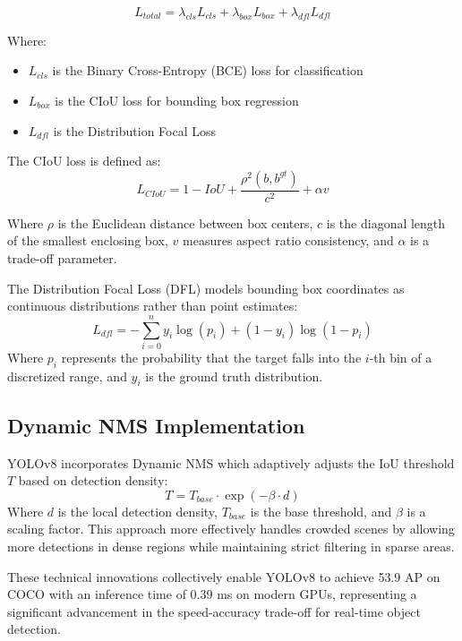 \documentclass[11pt]{article}
\begin{document}
\begin{equation}
L_{total} = \lambda_{cls}L_{cls} + \lambda_{box}L_{box} + \lambda_{dfl}L_{dfl}
\end{equation}

Where:
\begin{itemize}
\item $L_{cls}$ is the Binary Cross-Entropy (BCE) loss for classification
\item $L_{box}$ is the CIoU loss for bounding box regression
\item $L_{dfl}$ is the Distribution Focal Loss
\end{itemize}

The CIoU loss is defined as:
\begin{equation}
L_{CIoU} = 1 - IoU + \frac{\rho^2(b, b^{gt})}{c^2} + \alpha v
\end{equation}

Where $\rho$ is the Euclidean distance between box centers, $c$ is the diagonal length of the smallest enclosing box, $v$ measures aspect ratio consistency, and $\alpha$ is a trade-off parameter.

The Distribution Focal Loss (DFL) models bounding box coordinates as continuous distributions rather than point estimates:
\begin{equation}
L_{dfl} = -\sum_{i=0}^{n} y_i \log(p_i) + (1-y_i)\log(1-p_i)
\end{equation}
Where $p_i$ represents the probability that the target falls into the $i$-th bin of a discretized range, and $y_i$ is the ground truth distribution.

\subsection{Dynamic NMS Implementation}
YOLOv8 incorporates Dynamic NMS which adaptively adjusts the IoU threshold $T$ based on detection density:
\begin{equation}
T = T_{base} \cdot \exp(-\beta \cdot d)
\end{equation}
Where $d$ is the local detection density, $T_{base}$ is the base threshold, and $\beta$ is a scaling factor. This approach more effectively handles crowded scenes by allowing more detections in dense regions while maintaining strict filtering in sparse areas.

These technical innovations collectively enable YOLOv8 to achieve 53.9 AP on COCO with an inference time of 0.39 ms on modern GPUs, representing a significant advancement in the speed-accuracy trade-off for real-time object detection.
\end{document}
